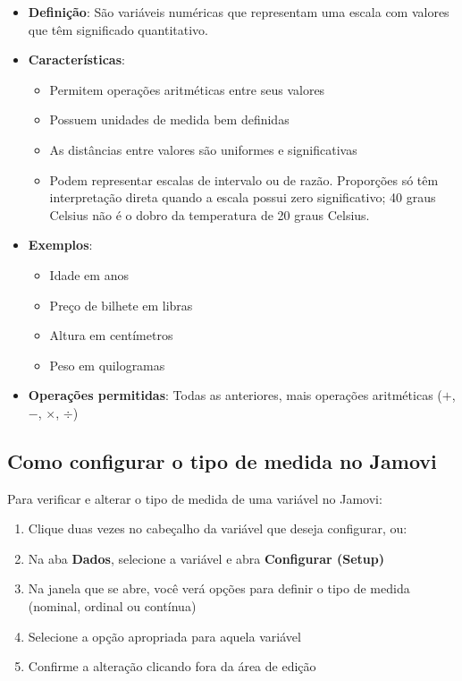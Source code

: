 \begin{itemize}
    \item \textbf{Definição}: São variáveis numéricas que representam uma escala com valores que têm significado quantitativo.
    \item \textbf{Características}:
    \begin{itemize}
        \item Permitem operações aritméticas entre seus valores
        \item Possuem unidades de medida bem definidas
        \item As distâncias entre valores são uniformes e significativas
        \item Podem representar escalas de intervalo ou de razão. Proporções só têm interpretação direta quando a escala possui zero significativo; 40 graus Celsius não é o dobro da temperatura de 20 graus Celsius.
    \end{itemize}
    \item \textbf{Exemplos}:
    \begin{itemize}
        \item Idade em anos
        \item Preço de bilhete em libras
        \item Altura em centímetros
        \item Peso em quilogramas
    \end{itemize}
    \item \textbf{Operações permitidas}: Todas as anteriores, mais operações aritméticas ($+$, $-$, $\times$, $\div$)
\end{itemize}

\subsection{Como configurar o tipo de medida no Jamovi}

Para verificar e alterar o tipo de medida de uma variável no Jamovi:

\begin{enumerate}
    \item Clique duas vezes no cabeçalho da variável que deseja configurar, ou:
    \item Na aba \textbf{Dados}, selecione a variável e abra \textbf{Configurar (Setup)}
    \item Na janela que se abre, você verá opções para definir o tipo de medida (nominal, ordinal ou contínua)
    \item Selecione a opção apropriada para aquela variável
    \item Confirme a alteração clicando fora da área de edição
\end{enumerate}

